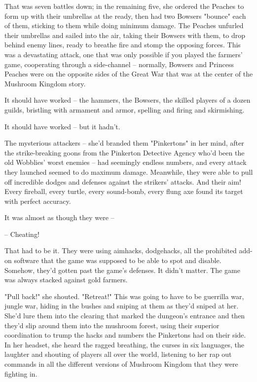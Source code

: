 That was seven battles down; in the remaining five, she ordered the
Peaches to form up with their umbrellas at the ready, then had two
Bowsers "bounce" each of them, sticking to them while doing minimum
damage. The Peaches unfurled their umbrellas and sailed into the
air, taking their Bowsers with them, to drop behind enemy lines,
ready to breathe fire and stomp the opposing forces. This was a
devastating attack, one that was only possible if you played the
farmers' game, cooperating through a side-channel -- normally,
Bowsers and Princess Peaches were on the opposite sides of the
Great War that was at the center of the Mushroom Kingdom story.

It should have worked -- the hammers, the Bowsers, the skilled
players of a dozen guilds, bristling with armament and armor,
spelling and firing and skirmishing.

It should have worked -- but it hadn't.

The mysterious attackers -- she'd branded them "Pinkertons" in her
mind, after the strike-breaking goons from the Pinkerton Detective
Agency who'd been the old Wobblies' worst enemies -- had seemingly
endless numbers, and every attack they launched seemed to do
maximum damage. Meanwhile, they were able to pull off incredible
dodges and defenses against the strikers' attacks. And their aim!
Every fireball, every turtle, every sound-bomb, every flung axe
found its target with perfect accuracy.

It was almost as though they were --

-- Cheating!

That had to be it. They were using aimhacks, dodgehacks, all the
prohibited add-on software that the game was supposed to be able to
spot and disable. Somehow, they'd gotten past the game's defenses.
It didn't matter. The game was always stacked against gold
farmers.

"Pull back!" she shouted. "Retreat!" This was going to have to be
guerrilla war, jungle war, hiding in the bushes and sniping at them
as they'd sniped at her. She'd lure them into the clearing that
marked the dungeon's entrance and then they'd slip around them into
the mushroom forest, using their superior coordination to trump the
hacks and numbers the Pinkertons had on their side. In her headset,
she heard the ragged breathing, the curses in six languages, the
laughter and shouting of players all over the world, listening to
her rap out commands in all the different versions of Mushroom
Kingdom that they were fighting in.

